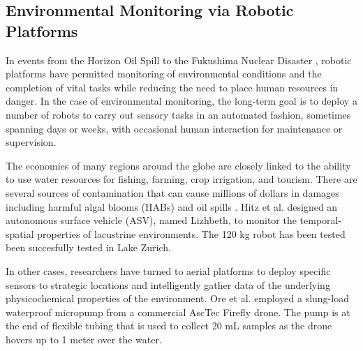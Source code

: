	\subsection{Environmental Monitoring via Robotic Platforms}%

		In events from the Horizon Oil Spill \cite{dssoa} to the Fukushima Nuclear Disaster \cite{Hasegawa2012}, robotic platforms have permitted monitoring of environmental conditions and the completion of vital tasks while reducing the need to place human resources in danger. In the case of environmental monitoring, the long-term goal is to deploy a number of robots to carry out sensory tasks in an automated fashion, sometimes spanning days or weeks, with occasional human interaction for maintenance or supervision.

		The economies of many regions around the globe are closely linked to the ability to use water resources for fishing, farming, crop irrigation, and tourism. There are several sources of contamination that can cause millions of dollars in damages including harmful algal blooms (HABs) and oil spills \cite{EPA2015a}. Hitz et al. \cite{Hitz2012} designed an autonomous surface vehicle (ASV), named Lizhbeth,  to monitor the temporal-spatial properties of lacustrine environments. The 120 kg robot has been tested been succesfully tested in Lake Zurich. 

		In other cases, researchers have turned to aerial platforms to deploy specific sensors to strategic locations and intelligently gather data of the underlying physicochemical properties of the environment. Ore et al. \cite{Ore2015} employed a slung-load waterproof micropump from a commercial AscTec Firefly drone. The pump is at the end of flexible tubing that is used to collect 20 mL samples as the drone hovers up to 1 meter over the water. 
		

